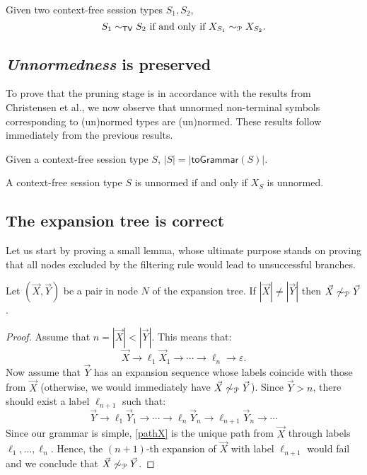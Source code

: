 \begin{theorem}
\label{cfst_vs_grammar}
	Given two context-free session types $S_1, S_2$,
	\[ S_1 \sim_{\mathsf{TV}} S_2 \text{ if and only if } X_{S_1} \sim_{\mathcal{P}} X_{S_2}. \]
\end{theorem}

\subsection{\textit{Unnormedness} is preserved}

To prove that the pruning stage is in accordance with the results 
from Christensen et al., we now observe that unnormed non-terminal symbols 
corresponding to (un)normed types are (un)normed. These results follow 
immediately from the previous results. 

\begin{corollary}
	Given a context-free session type $S$, $|S| = |\mathsf{toGrammar}(S)|$.
\end{corollary}

\begin{corollary}
	A context-free session type $S$ is unnormed if and only if 
	$X_S$ is unnormed.
\end{corollary}

\subsection{The expansion tree is correct}

Let us start by proving a small lemma, whose ultimate purpose 
stands on proving that all nodes excluded by the filtering rule
would lead to unsuccessful branches.

\begin{lemma}
\label{lemma:filtering}
	Let $(\vec X, \vec Y)$ be a pair in node $N$ of the expansion tree. 
	If $|\vec X| \neq |\vec Y|$ then  $\vec X \not\sim_{\mathcal{P}} \vec Y$.
\end{lemma}

\begin{proof}
	Assume that $n = |\vec X| < |\vec Y|$. This means that:
	\begin{equation}
	\label{pathX}
		\vec X \rightarrow \ell_1 \vec X_1 \rightarrow \cdots 
		\rightarrow \ell_n \rightarrow \varepsilon.
	\end{equation}
	Now assume that $\vec Y$ has an expansion sequence whose 
	labels coincide with those from $\vec X$ (otherwise, we would immediately
	have $\vec X \not\sim_{\mathcal{P}} \vec Y$). Since $\vec Y > n$, there should 
	exist a label $\ell_{n+1}$ such that:
	\[\vec Y \rightarrow \ell_1 \vec Y_1 \rightarrow \cdots 
	\rightarrow \ell_n \vec Y_n\rightarrow \ell_{n+1} \vec Y_n 
	\rightarrow \cdots\]
	Since our grammar is simple, \eqref{pathX} is the unique path from $\vec X$
	through labels $\ell_1, \ldots, \ell_n$. Hence, the $(n+1)$-th expansion of
	$\vec X$ with label $\ell_{n+1}$ would fail and we conclude that
	$\vec X \not\sim_{\mathcal{P}} \vec Y$.
\end{proof}

